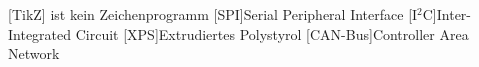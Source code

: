 
\begin{acronym}[ACRONYM]
[TikZ]{\TikZ{} ist kein Zeichenprogramm}
[SPI]{Serial Peripheral Interface}
[I$^2$C]{Inter-Integrated Circuit}
[XPS]{Extrudiertes Polystyrol}
[CAN-Bus]{Controller Area Network}
\end{acronym}\newpage

